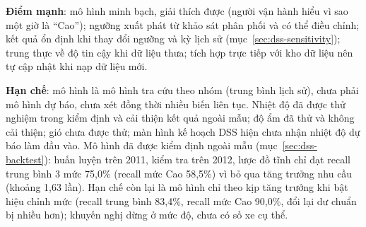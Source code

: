 \textbf{Điểm mạnh}: mô hình minh bạch, giải thích được (người vận hành hiểu vì sao một giờ là ``Cao''); ngưỡng xuất phát từ khảo sát phân phối và có thể điều chỉnh; kết quả ổn định khi thay đổi ngưỡng và kỳ lịch sử (mục~\ref{sec:dss-sensitivity}); trung thực về độ tin cậy khi dữ liệu thưa; tích hợp trực tiếp với kho dữ liệu nên tự cập nhật khi nạp dữ liệu mới.

\textbf{Hạn chế}: mô hình là mô hình tra cứu theo nhóm (trung bình lịch sử), chưa phải mô hình dự báo, chưa xét đồng thời nhiều biến liên tục. Nhiệt độ đã được thử nghiệm trong kiểm định và cải thiện kết quả ngoài mẫu; độ ẩm đã thử và không cải thiện; gió chưa được thử; màn hình kế hoạch DSS hiện chưa nhận nhiệt độ dự báo làm đầu vào. Mô hình đã được kiểm định ngoài mẫu (mục~\ref{sec:dss-backtest}): huấn luyện trên 2011, kiểm tra trên 2012, lược đồ tĩnh chỉ đạt recall trung bình 3 mức 75,0\% (recall mức Cao 58,5\%) vì bỏ qua tăng trưởng nhu cầu (khoảng 1,63 lần). Hạn chế còn lại là mô hình chỉ theo kịp tăng trưởng khi bật hiệu chỉnh mức (recall trung bình 83,4\%, recall mức Cao 90,0\%, đổi lại dư chuẩn bị nhiều hơn); khuyến nghị dừng ở mức độ, chưa có số xe cụ thể.
